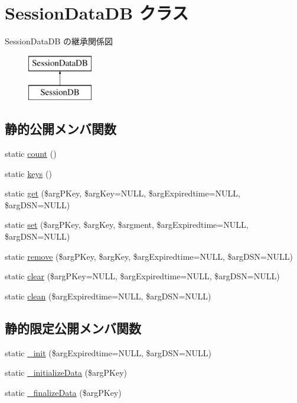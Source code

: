 \hypertarget{class_session_data_d_b}{}\section{Session\+Data\+D\+B クラス}
\label{class_session_data_d_b}
Session\+Data\+D\+B の継承関係図\begin{figure}[H]
\begin{center}
\leavevmode
\includegraphics[height=2.000000cm]{class_session_data_d_b}
\end{center}
\end{figure}
\subsection*{静的公開メンバ関数}
\begin{DoxyCompactItemize}
\item 
static \hyperlink{class_session_data_d_b_a30a6d59940e834b23526a6db33426c12}{count} ()
\item 
static \hyperlink{class_session_data_d_b_a5ead6e650d4dc5995055fbac20e10313}{keys} ()
\item 
static \hyperlink{class_session_data_d_b_a24bd89e237f187754ee975eec333145c}{get} (\$arg\+P\+Key, \$arg\+Key=N\+U\+L\+L, \$arg\+Expiredtime=N\+U\+L\+L, \$arg\+D\+S\+N=N\+U\+L\+L)
\item 
static \hyperlink{class_session_data_d_b_a989a00d64948f48d38e7f00cce59d260}{set} (\$arg\+P\+Key, \$arg\+Key, \$argment, \$arg\+Expiredtime=N\+U\+L\+L, \$arg\+D\+S\+N=N\+U\+L\+L)
\item 
static \hyperlink{class_session_data_d_b_a35c45b3fa9727b478fdcde5909af9b79}{remove} (\$arg\+P\+Key, \$arg\+Key, \$arg\+Expiredtime=N\+U\+L\+L, \$arg\+D\+S\+N=N\+U\+L\+L)
\item 
static \hyperlink{class_session_data_d_b_aaeb3d693283e237081b09cfeeaf08d79}{clear} (\$arg\+P\+Key=N\+U\+L\+L, \$arg\+Expiredtime=N\+U\+L\+L, \$arg\+D\+S\+N=N\+U\+L\+L)
\item 
static \hyperlink{class_session_data_d_b_a36aedcb2b3168ec01821468849fae5ed}{clean} (\$arg\+Expiredtime=N\+U\+L\+L, \$arg\+D\+S\+N=N\+U\+L\+L)
\end{DoxyCompactItemize}
\subsection*{静的限定公開メンバ関数}
\begin{DoxyCompactItemize}
\item 
static \hyperlink{class_session_data_d_b_a620d706ba28277c7b81195a6eed29ef4}{\+\_\+init} (\$arg\+Expiredtime=N\+U\+L\+L, \$arg\+D\+S\+N=N\+U\+L\+L)
\item 
static \hyperlink{class_session_data_d_b_a1e5ef25b9f9a6b7931658e69facbed46}{\+\_\+initialize\+Data} (\$arg\+P\+Key)
\item 
static \hyperlink{class_session_data_d_b_a0310669f6d2bc51db4d75828fd1700c2}{\+\_\+finalize\+Data} (\$arg\+P\+Key)
\end{DoxyCompactItemize}
